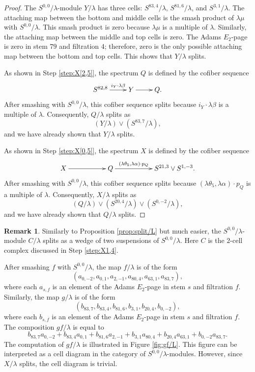 \documentclass{amsart}
\theoremstyle{definition}
\newtheorem{rmk}[thm]{Remark}
\newcommand{\Xtwofour}{Y}
\newcommand{\Xtwofive}{Q}
\newcommand{\Xonefour}{C}
\begin{document}
\begin{proof}
The $S^{0,0}/\lambda$-module
$\Xtwofour/\lambda$ has three cells:
$S^{83, 4}/\lambda$, $S^{81, 6}/\lambda$, and $S^{3,1}/\lambda$.
The attaching map between the bottom and middle cells is 
the smash product of $\lambda \mu$ with $S^{0,0}/\lambda$.
This smash product is zero because $\lambda \mu$ is a multiple of $\lambda$.
Similarly, 
the attaching map between the middle and top cells is zero.
The Adams $E_2$-page is zero in stem $79$ and filtration $4$;
therefore, zero is the only possible attaching map between the 
bottom and top cells.
This shows that $\Xtwofour/\lambda$ splits.

As shown in Step \ref{step:X[2,5]}, the spectrum
$\Xtwofive$ is defined by the cofiber sequence
\[
\xymatrix{
S^{82,8} \ar[r]^-{i_\Xtwofour \cdot \lambda \beta} & \Xtwofour \ar[r] & \Xtwofive. 
}
\]
After smashing with $S^{0,0}/\lambda$, this cofiber sequence splits
because $i_\Xtwofour \cdot \lambda \beta$ is a multiple of $\lambda$.
Consequently, $\Xtwofive/\lambda$ splits as
\[
\left( \Xtwofour/\lambda \right) \vee
\left (S^{83,7}/\lambda \right),
\]
and we have already shown that $\Xtwofour/\lambda$ splits.

As shown in Step \ref{step:X[0,5]}, the spectrum
$X$ is defined by the cofiber sequence
\[
\xymatrix{
X \ar[rr] && \Xtwofive \ar[rr]^-{(\lambda \theta_5, \lambda \alpha) \cdot p_\Xtwofive} && S^{21,3} \vee S^{1,-3}. 
}
\]
After smashing with $S^{0,0}/\lambda$, this cofiber sequence splits
because $(\lambda \theta_5, \lambda \alpha) \cdot p_\Xtwofive$ is a multiple
of $\lambda$.  Consequently, $X/\lambda$ splits as
\[
\left( \Xtwofive/\lambda \right) \vee
\left (S^{20,4}/\lambda \right) \vee
\left (S^{0,-2}/\lambda \right),
\]
and we have already shown that $\Xtwofive/\lambda$ splits.
\end{proof}

\begin{rmk}
\label{rmk:split/L}
Similarly to Proposition \ref{prop:split/L} but much easier, the
$S^{0,0}/\lambda$-module $\Xonefour/\lambda$ splits as a wedge of two
suspensions of $S^{0,0}/\lambda$.  Here $\Xonefour$ is the $2$-cell complex
discussed in Step \ref{step:X1,4}.
\end{rmk}

After smashing $f$ with $S^{0,0}/\lambda$, the map
$f/\lambda$ is of the form
\[
\left( a_{0,-2}, a_{0,1}, a_{2,-1}, a_{80, 4}, a_{63, 1}, a_{83, 7}
\right),
\]
where each $a_{s,f}$ is an element of the Adams $E_2$-page in
stem $s$ and filtration $f$.
Similarly, the map $g/\lambda$ is of the form
\[
\left( b_{83,7}, b_{83,4}, b_{81,6}, b_{3,1}, b_{20,4}, b_{0,-2} \right),
\]
where each $b_{s,f}$ is an element of the Adams $E_2$-page 
in stem $s$ and filtration $f$.
The composition $g f /\lambda$ is equal to
\[
b_{83,7} a_{0,-2} +
b_{83,4} a_{0,1} +
b_{81,6} a_{2,-1} +
b_{3,1} a_{80,4} + 
b_{20,4} a_{63,1} +
b_{0,-2} a_{83,7}.
\]
The computation of $g f /\lambda$ is illustrated in 
Figure \ref{fig:gf/L}.  This figure can be interpreted as a cell diagram
in the category of $S^{0,0}/\lambda$-modules.  However, since $X/\lambda$
splits, the cell diagram is trivial.
\end{document}

